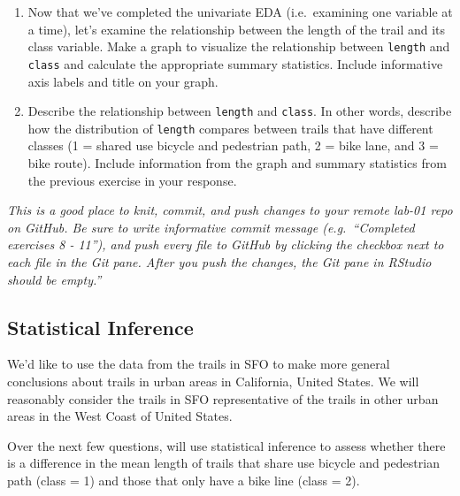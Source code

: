 \documentclass[
]{article}
\begin{document}
\begin{enumerate}
\def\labelenumi{\arabic{enumi}.}
\setcounter{enumi}{9}
\item
  Now that we've completed the univariate EDA (i.e.~examining one
  variable at a time), let's examine the relationship between the length
  of the trail and its class variable. Make a graph to visualize the
  relationship between \texttt{length} and \texttt{class} and calculate
  the appropriate summary statistics. Include informative axis labels
  and title on your graph.
\item
  Describe the relationship between \texttt{length} and \texttt{class}.
  In other words, describe how the distribution of \texttt{length}
  compares between trails that have different classes (1 = shared use
  bicycle and pedestrian path, 2 = bike lane, and 3 = bike route).
  Include information from the graph and summary statistics from the
  previous exercise in your response.
\end{enumerate}

\emph{This is a good place to knit, commit, and push changes to your
remote lab-01 repo on GitHub. Be sure to write informative commit
message (e.g.~``Completed exercises 8 - 11''), and push every file to
GitHub by clicking the checkbox next to each file in the Git pane. After
you push the changes, the Git pane in RStudio should be empty.''}

\hypertarget{statistical-inference}{%
\subsection{Statistical Inference}\label{statistical-inference}}

We'd like to use the data from the trails in SFO to make more general
conclusions about trails in urban areas in California, United States. We
will reasonably consider the trails in SFO representative of the trails
in other urban areas in the West Coast of United States.

Over the next few questions, will use statistical inference to assess
whether there is a difference in the mean length of trails that share
use bicycle and pedestrian path (class = 1) and those that only have a
bike line (class = 2).
\end{document}
